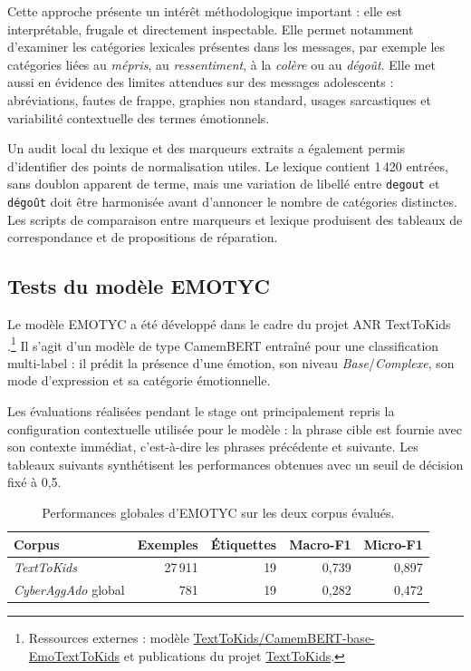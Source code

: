 Cette approche présente un intérêt méthodologique important : elle est interprétable, frugale et directement inspectable. Elle permet notamment d'examiner les catégories lexicales présentes dans les messages, par exemple les catégories liées au \textit{mépris}, au \textit{ressentiment}, à la \textit{colère} ou au \textit{dégoût}. Elle met aussi en évidence des limites attendues sur des messages adolescents : abréviations, fautes de frappe, graphies non standard, usages sarcastiques et variabilité contextuelle des termes émotionnels.

Un audit local du lexique et des marqueurs extraits a également permis d'identifier des points de normalisation utiles. Le lexique contient 1\,420 entrées, sans doublon apparent de terme, mais une variation de libellé entre \texttt{degout} et \texttt{dégoût} doit être harmonisée avant d'annoncer le nombre de catégories distinctes. Les scripts de comparaison entre marqueurs et lexique produisent des tableaux de correspondance et de propositions de réparation.

\subsection{Tests du modèle EMOTYC}

Le modèle EMOTYC a été développé dans le cadre du projet ANR TextToKids \citep{etienne2023analyse,etienne2024emotionidentificationfrenchwritten}.\footnote{Ressources externes : modèle \href{https://huggingface.co/TextToKids/CamemBERT-base-EmoTextToKids}{TextToKids/CamemBERT-base-EmoTextToKids} et publications du projet \href{https://texttokids.irisa.fr/publications/}{TextToKids}.} Il s'agit d'un modèle de type CamemBERT entraîné pour une classification multi-label : il prédit la présence d'une émotion, son niveau \textit{Base}/\textit{Complexe}, son mode d'expression et sa catégorie émotionnelle.

Les évaluations réalisées pendant le stage ont principalement repris la configuration contextuelle utilisée pour le modèle : la phrase cible est fournie avec son contexte immédiat, c'est-à-dire les phrases précédente et suivante. Les tableaux suivants synthétisent les performances obtenues avec un seuil de décision fixé à 0,5.

\begin{table}[htbp]
  \centering
  \small
  \begin{tabular}{lrrrr}
    \toprule
    Corpus & Exemples & Étiquettes & Macro-F1 & Micro-F1 \\
    \midrule
    \textit{TextToKids} & 27\,911 & 19 & 0,739 & 0,897 \\
    \textit{CyberAggAdo} global & 781 & 19 & 0,282 & 0,472 \\
    \bottomrule
  \end{tabular}
  \caption{Performances globales d'EMOTYC sur les deux corpus évalués.}
  \label{tab:perf-globales}
\end{table}

